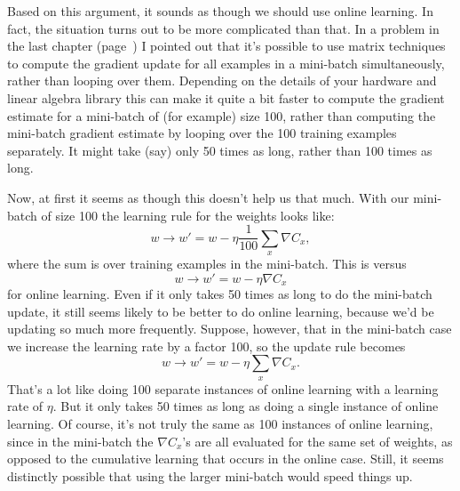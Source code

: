 Based on this argument, it sounds as though we should use online learning. In fact, the situation turns out to be more complicated than that. In a problem in the last chapter (page~\pageref{page:matrixbackpropagation}) I pointed out that it's possible to use matrix techniques to compute the gradient update for all examples in a mini-batch simultaneously, rather than looping over them. Depending on the details of your hardware and linear algebra library this can make it quite a bit faster to compute the gradient estimate for a mini-batch of (for example) size 100, rather than computing the mini-batch gradient estimate by looping over the 100 training examples separately. It might take (say) only 50 times as long, rather than 100 times as long.


Now, at first it seems as though this doesn't help us that much. With our mini-batch of size 100
the learning rule for the weights looks like: 
\begin{equation} 
w \rightarrow w' = w-\eta \frac{1}{100} \sum_x \nabla C_x, 
\label{eq:c03-100}
\end{equation}
where the sum is over training examples in the mini-batch. This is versus 
\begin{equation} 
 w   \rightarrow 
w' = w-\eta \nabla C_x 
\label{eq:c03-101}
\end{equation} 
for online learning. Even if it only takes 50 times as long to do the mini-batch update, it still seems likely to be better to do online learning, because we'd be updating so much more frequently. Suppose, however, that in the mini-batch case we increase the learning rate by a factor 100, so the update rule becomes 
\begin{equation} 
    w \rightarrow w' = w-\eta \sum_x \nabla C_x. 
    \label{eq:c03-102}
\end{equation}
That's a lot like doing 100 separate instances of online learning with a learning rate of $\eta$. But it only takes 50 times as long as doing a single instance of online learning. Of course, it's not truly the same as 100 instances of online learning, since in the mini-batch the $\nabla C_x$'s are all evaluated for the same set of weights, as opposed to the cumulative learning that occurs in the online case. Still, it seems distinctly possible that using the larger mini-batch would speed things up.

